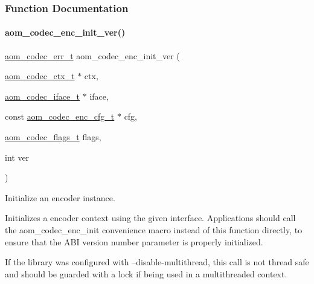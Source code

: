 \subsubsection{Function Documentation}
\mbox{\label{group__encoder_ga205cf6f9460f4b4a842872012ef6fb0c}} 
\paragraph{\texorpdfstring{aom\+\_\+codec\+\_\+enc\+\_\+init\+\_\+ver()}{aom\_codec\_enc\_init\_ver()}}
{\footnotesize\ttfamily \hyperlink{group__codec_gaaae61e0f8663e6137f1e228757248e7c}{aom\+\_\+codec\+\_\+err\+\_\+t} aom\+\_\+codec\+\_\+enc\+\_\+init\+\_\+ver (\begin{DoxyParamCaption}\item[{\hyperlink{group__codec_ga9a1d27f9742d9f70783e3c6cb849b5b4}{aom\+\_\+codec\+\_\+ctx\+\_\+t} $\ast$}]{ctx,  }\item[{\hyperlink{group__codec_ga4ef55b44c762836d1550e11921bed403}{aom\+\_\+codec\+\_\+iface\+\_\+t} $\ast$}]{iface,  }\item[{const \hyperlink{group__encoder_gab9627d5dcf858b7e755a5fc4a879e451}{aom\+\_\+codec\+\_\+enc\+\_\+cfg\+\_\+t} $\ast$}]{cfg,  }\item[{\hyperlink{group__codec_ga18f2242c1afca329581fbd3f2c81721b}{aom\+\_\+codec\+\_\+flags\+\_\+t}}]{flags,  }\item[{int}]{ver }\end{DoxyParamCaption})}



Initialize an encoder instance. 

Initializes a encoder context using the given interface. Applications should call the aom\+\_\+codec\+\_\+enc\+\_\+init convenience macro instead of this function directly, to ensure that the A\+BI version number parameter is properly initialized.

If the library was configured with --disable-\/multithread, this call is not thread safe and should be guarded with a lock if being used in a multithreaded context.


